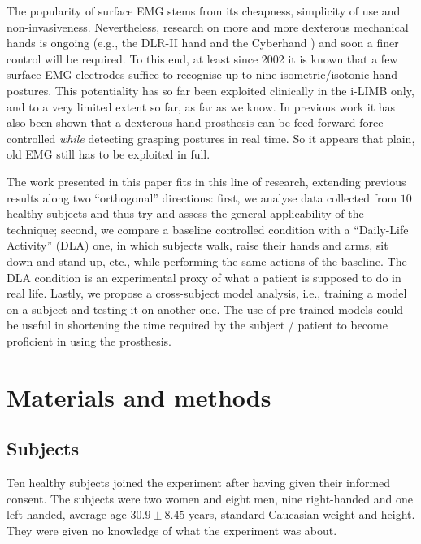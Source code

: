 \documentclass[10pt]{bmc_article}
\newenvironment{bmcformat}
  {\begin{raggedright}\baselineskip20pt\sloppy\setboolean{publ}{false}}
  {\end{raggedright}\baselineskip20pt\sloppy}
\begin{document}
\begin{bmcformat}
The popularity of surface EMG stems from its cheapness, simplicity of use
and non-invasiveness. Nevertheless, research on more and more dexterous
mechanical hands is ongoing (e.g., the DLR-II hand \cite{Hua2006} and the
Cyberhand \cite{cyberhand,cipriani}) and soon a finer control will be
required. To this end, at least since 2002
\cite{dunlop,zecca,smagt,2008.ICRA} it is known that a few surface EMG
electrodes suffice to recognise up to nine isometric/isotonic hand postures.
This potentiality has so far been exploited clinically in the i-LIMB only,
and to a very limited extent so far, as far as we know. In previous work
it has also been shown that a dexterous hand prosthesis can be
feed-forward force-controlled \emph{while} detecting
grasping postures \cite{2008.ICRA,2008.BioCyb} in real time.
So it appears that plain, old EMG still has to be exploited in full.

The work presented in this paper fits in this line of research,
extending previous results along two ``orthogonal'' directions: first, we analyse
data collected from $10$ healthy subjects and thus try and assess the general
applicability of the technique; second, we compare a baseline controlled
condition with a ``Daily-Life Activity'' (DLA) one, in which subjects walk, raise
their hands and arms, sit down and stand up, etc., while performing the same
actions of the baseline. The DLA condition is an experimental proxy
of what a patient is supposed to do in real life. Lastly, we propose a
cross-subject model analysis, i.e., training a
model on a subject and testing it on another one. The use
of pre-trained models could be useful in shortening the time required by
the subject / patient to become proficient in using the prosthesis.

\section*{Materials and methods}
\label{sec:m&ms}

\subsection*{Subjects}

Ten healthy subjects joined the experiment after having given their informed
consent. The subjects were two women and eight men, nine right-handed and one
left-handed, average age $30.9 \pm 8.45$ years, standard Caucasian weight and
height. They were given no knowledge of what the experiment was about.


\end{bmcformat}
\end{document}

